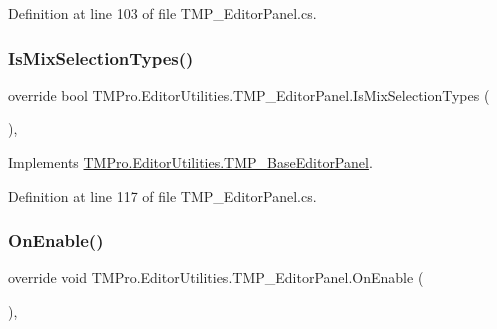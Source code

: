 Definition at line 103 of file T\+M\+P\+\_\+\+Editor\+Panel.\+cs.

\mbox{\label{class_t_m_pro_1_1_editor_utilities_1_1_t_m_p___editor_panel_afd65387972f0d704f001c4563850e610}} 
\subsubsection{\texorpdfstring{IsMixSelectionTypes()}{IsMixSelectionTypes()}}
{\footnotesize\ttfamily override bool T\+M\+Pro.\+Editor\+Utilities.\+T\+M\+P\+\_\+\+Editor\+Panel.\+Is\+Mix\+Selection\+Types (\begin{DoxyParamCaption}{ }\end{DoxyParamCaption})\hspace{0.3cm}{\ttfamily [protected]}, {\ttfamily [virtual]}}



Implements \mbox{\hyperlink{class_t_m_pro_1_1_editor_utilities_1_1_t_m_p___base_editor_panel_a2d01dae660062e1028c4b28f40689aa9}{T\+M\+Pro.\+Editor\+Utilities.\+T\+M\+P\+\_\+\+Base\+Editor\+Panel}}.



Definition at line 117 of file T\+M\+P\+\_\+\+Editor\+Panel.\+cs.

\mbox{\label{class_t_m_pro_1_1_editor_utilities_1_1_t_m_p___editor_panel_a5c6c52a7543455d4968fb1c438f73c18}} 
\subsubsection{\texorpdfstring{OnEnable()}{OnEnable()}}
{\footnotesize\ttfamily override void T\+M\+Pro.\+Editor\+Utilities.\+T\+M\+P\+\_\+\+Editor\+Panel.\+On\+Enable (\begin{DoxyParamCaption}{ }\end{DoxyParamCaption})\hspace{0.3cm}{\ttfamily [protected]}, {\ttfamily [virtual]}}



